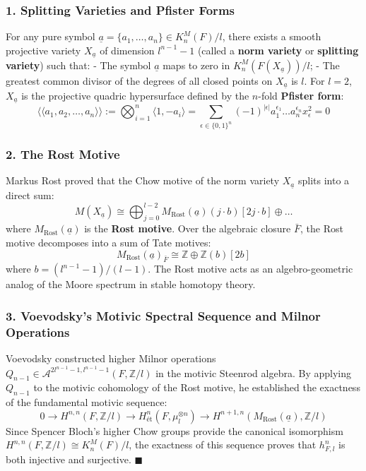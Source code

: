 \documentclass[11pt,twoside,openright]{amsbook}
\begin{document}
{\subsubsection{1. Splitting Varieties and Pfister Forms}
For any pure symbol $\underline{a} = \{a_1, \dots, a_n\} \in K_n^M(F)/l$, there exists a smooth projective variety $X_{\underline{a}}$ of dimension $l^{n-1} - 1$ (called a \textbf{norm variety} or \textbf{splitting variety}) such that:
- The symbol $\underline{a}$ maps to zero in $K_n^M(F(X_{\underline{a}}))/l$;
- The greatest common divisor of the degrees of all closed points on $X_{\underline{a}}$ is $l$.
For $l=2$, $X_{\underline{a}}$ is the projective quadric hypersurface defined by the $n$-fold \textbf{Pfister form}:
$$\langle\!\langle a_1, a_2, \dots, a_n \rangle\!\rangle := \bigotimes_{i=1}^n \langle 1, -a_i \rangle = \sum_{\epsilon \in \{0, 1\}^n} (-1)^{|\epsilon|} a_1^{\epsilon_1} \dots a_n^{\epsilon_n} x_\epsilon^2 = 0$$

\subsubsection{2. The Rost Motive}
Markus Rost proved that the Chow motive of the norm variety $X_{\underline{a}}$ splits into a direct sum:
$$M(X_{\underline{a}}) \cong \bigoplus_{j=0}^{l-2} M_{\mathrm{Rost}}(\underline{a})(j \cdot b)[2j \cdot b] \oplus \dots$$
where $M_{\mathrm{Rost}}(\underline{a})$ is the \textbf{Rost motive}. Over the algebraic closure $\bar{F}$, the Rost motive decomposes into a sum of Tate motives:
$$M_{\mathrm{Rost}}(\underline{a})_{\bar{F}} \cong \mathbb{Z} \oplus \mathbb{Z}(b)[2b]$$
where $b = (l^{n-1} - 1) / (l - 1)$. The Rost motive acts as an algebro-geometric analog of the Moore spectrum in stable homotopy theory.

\subsubsection{3. Voevodsky's Motivic Spectral Sequence and Milnor Operations}
Voevodsky constructed higher Milnor operations $Q_{n-1} \in \mathcal{A}^{2l^{n-1}-1, l^{n-1}-1}(F, \mathbb{Z}/l)$ in the motivic Steenrod algebra. By applying $Q_{n-1}$ to the motivic cohomology of the Rost motive, he established the exactness of the fundamental motivic sequence:
$$0 \longrightarrow H^{n, n}(F, \mathbb{Z}/l) \longrightarrow H^n_{\text{ét}}(F, \mu_l^{\otimes n}) \longrightarrow H^{n+1, n}(M_{\mathrm{Rost}}(\underline{a}), \mathbb{Z}/l)$$
Since Spencer Bloch's higher Chow groups provide the canonical isomorphism $H^{n, n}(F, \mathbb{Z}/l) \cong K_n^M(F)/l$, the exactness of this sequence proves that $h_{F, l}^n$ is both injective and surjective. $\blacksquare$

}
\end{document}
